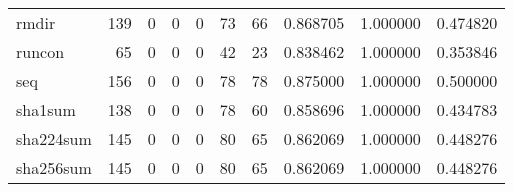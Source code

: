 \begin{tabular}{lrrrrrrrrr}
rmdir     &                                   139 &                                                  0 &                                                  0 &                                                  0 &                                                 73 &                                                 66 &                                           0.868705 &                               1.000000 &                             0.474820 \\
runcon    &                                    65 &                                                  0 &                                                  0 &                                                  0 &                                                 42 &                                                 23 &                                           0.838462 &                               1.000000 &                             0.353846 \\
seq       &                                   156 &                                                  0 &                                                  0 &                                                  0 &                                                 78 &                                                 78 &                                           0.875000 &                               1.000000 &                             0.500000 \\
sha1sum   &                                   138 &                                                  0 &                                                  0 &                                                  0 &                                                 78 &                                                 60 &                                           0.858696 &                               1.000000 &                             0.434783 \\
sha224sum &                                   145 &                                                  0 &                                                  0 &                                                  0 &                                                 80 &                                                 65 &                                           0.862069 &                               1.000000 &                             0.448276 \\
sha256sum &                                   145 &                                                  0 &                                                  0 &                                                  0 &                                                 80 &                                                 65 &                                           0.862069 &                               1.000000 &                             0.448276 \\

\end{tabular}
